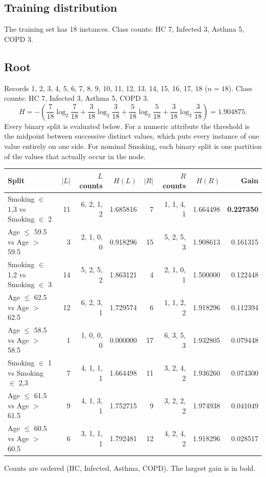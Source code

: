 \subsection*{Training distribution}
The training set has 18 instances. Class counts: HC 7, Infected 3, Asthma 5, COPD 3.
\subsection*{Root}

Records 1, 2, 3, 4, 5, 6, 7, 8, 9, 10, 11, 12, 13, 14, 15, 16, 17, 18 ($n=18$). Class counts: HC 7, Infected 3, Asthma 5, COPD 3.
\[ H = -\left(\frac{7}{18}\log_2\frac{7}{18}+\frac{3}{18}\log_2\frac{3}{18}+\frac{5}{18}\log_2\frac{5}{18}+\frac{3}{18}\log_2\frac{3}{18}\right) = 1.904875. \]
Every binary split is evaluated below. For a numeric attribute the threshold is the midpoint between successive distinct values, which puts every instance of one value entirely on one side. For nominal Smoking, each binary split is one partition of the values that actually occur in the node.

\begin{center}
\scriptsize
\begin{tabular}{lrrrrrrr}
\toprule
Split & $|L|$ & $L$ counts & $H(L)$ & $|R|$ & $R$ counts & $H(R)$ & Gain \\
\midrule
Smoking $\in$ {1,3} vs Smoking $\in$ {2} & 11 & 6, 2, 1, 2 & 1.685816 & 7 & 1, 1, 4, 1 & 1.664498 &  \textbf{0.227350} \\
Age $\le$ 59.5 vs Age $>$ 59.5 & 3 & 2, 1, 0, 0 & 0.918296 & 15 & 5, 2, 5, 3 & 1.908613 & 0.161315 \\
Smoking $\in$ {1,2} vs Smoking $\in$ {3} & 14 & 5, 2, 5, 2 & 1.863121 & 4 & 2, 1, 0, 1 & 1.500000 & 0.122448 \\
Age $\le$ 62.5 vs Age $>$ 62.5 & 12 & 6, 2, 3, 1 & 1.729574 & 6 & 1, 1, 2, 2 & 1.918296 & 0.112394 \\
Age $\le$ 58.5 vs Age $>$ 58.5 & 1 & 1, 0, 0, 0 & 0.000000 & 17 & 6, 3, 5, 3 & 1.932805 & 0.079448 \\
Smoking $\in$ {1} vs Smoking $\in$ {2,3} & 7 & 4, 1, 1, 1 & 1.664498 & 11 & 3, 2, 4, 2 & 1.936260 & 0.074300 \\
Age $\le$ 61.5 vs Age $>$ 61.5 & 9 & 4, 1, 3, 1 & 1.752715 & 9 & 3, 2, 2, 2 & 1.974938 & 0.041049 \\
Age $\le$ 60.5 vs Age $>$ 60.5 & 6 & 3, 1, 1, 1 & 1.792481 & 12 & 4, 2, 4, 2 & 1.918296 & 0.028517 \\
\bottomrule
\end{tabular}
\end{center}
Counts are ordered (HC, Infected, Asthma, COPD). The largest gain is in bold.

